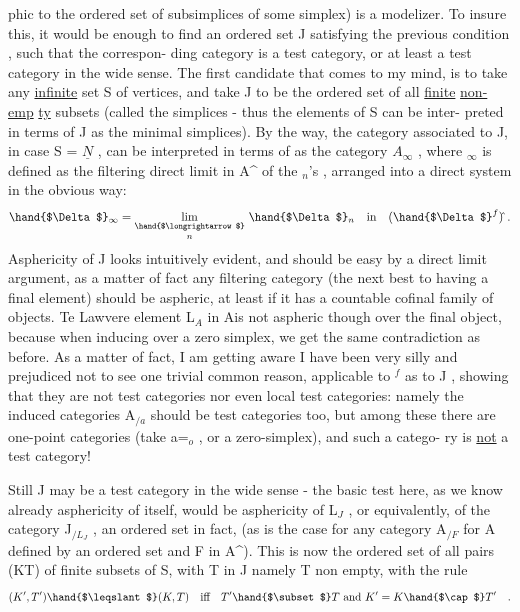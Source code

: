 
phic to the ordered set of subsimplices of some simplex) is a modelizer.
To insure this,  it would be enough to find an ordered set J satisfying the
previous condition , such that the correspon-%
ding category is a test category,  or at least a test category in the wide
sense.  The first candidate that comes to my mind,  is to take any \uline{infinite}
set S of vertices,  and take J to be the ordered set of all \uline{finite} \uline{non-emp}%
\uline{ty} subsets (called the simplices  -  thus the elements of S can be inter-%
preted in terms of J as the minimal simplices).  By the way,  the category
associated to J,  in case S = $\underline{N}$ ,  can be interpreted in terms of  as
the category  $A$\hand{$_{/\Delta}$}$_{\infty}$ ,  where \hand{$\Delta$}$_\infty$ is defined as the filtering direct limit
 in A\^{} of the \hand{$\Delta$}$_n$'s ,  arranged into a direct system in the obvious way:
%
\[ \hand{$\Delta$}_\infty = \underset{n}{\underset{\hand{$\longrightarrow$}}{\mathrm{lim}}}\ \hand{$\Delta$}_n \quad \text{in} \quad (\hand{$\Delta$}^f)\hat{}\ . \]
Asphericity of J looks intuitively evident,  and should be easy by a direct
limit argument,  as a matter of fact any filtering  category (the next
best to having a final element) should be aspheric,  at least if it has a
countable cofinal family of objects.  Te Lawvere element  L$_A$ in A\hand{\^{}}is not
aspheric though over the final object,  because when inducing over a zero
simplex,  we get the same contradiction as before.  As a matter of fact,
I am getting aware I have been very silly and prejudiced not to see one
trivial common reason,  applicable to \hand{$\Delta$}$^f$ as to J , showing that they are
not test categories nor even local test categories:  namely the induced
categories A$_{/a}$ should be test categories too,  but among these there are
one-point categories (take a=\hand{$\Delta$}$_o$ ,  or a zero-simplex),  and such a catego-%
ry is \uline{not} a test category!

Still J may be a test category in the wide sense - the basic test here,
as we know already asphericity of  itself,  would be  asphericity of L$_J$ ,
or equivalently,  of the category J$_{/L_J}$ ,  an ordered set in fact, 
(as is the case for any category A$_{/F}$ for A defined by an ordered set
and F in A\^{}).  This is now the ordered set of all pairs  (K\hand{$\subset$}T)  of
finite subsets of S,  with T in J namely T non empty,  with the rule
\[ (K',T') \hand{$\leqslant$} (K,T) \quad \text{iff} \quad T'\hand{$\subset$}T \ \text{and}\ K'=K\hand{$\cap$}T' \quad . \]
